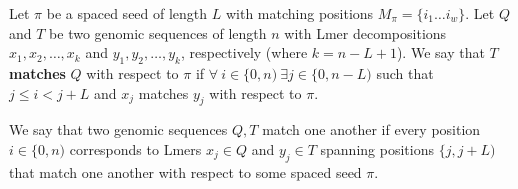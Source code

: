 \begin{defn}
Let $\pi$ be a spaced seed of length $L$ with matching positions $M_{\pi} = \lbrace i_{1} \dotsc i_{w} \rbrace$. Let $Q$ and $T$ be two genomic sequences of length $n$ with Lmer decompositions $x_{1},x_{2},\dotsc ,x_{k}$ and $y_{1},y_{2},\dotsc ,y_{k}$, respectively (where $k = n - L + 1$). We say that $T$ \textbf{matches} $Q$ with respect to $\pi$ if $\forall \  i \in \lbrace 0, n) \ \exists j \in \lbrace 0, n-L)$ such that $j \leq i < j+L$ and $x_{j}$ matches $y_{j}$ with respect to $\pi$.
\end{defn}

We say that two genomic sequences $Q,T$ match one another if every position $i \in \lbrace 0,n)$ corresponds to Lmers $x_{j} \in Q$ and $y_{j} \in T$ spanning positions $\lbrace j,j+L)$ that match one another with respect to some spaced seed $\pi$.

